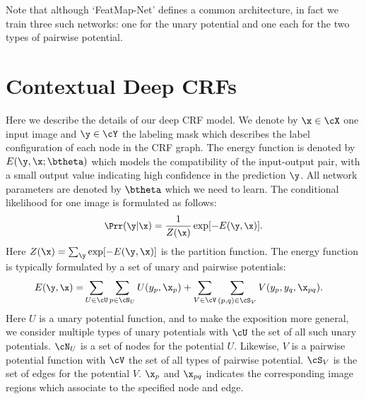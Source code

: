 Note that although `FeatMap-Net' defines a common architecture, in fact we train three such networks: one for the unary potential and one each for the two types of pairwise potential.




\section{Contextual Deep CRFs}
\label{sec:crf_details}

Here we describe the details of our deep CRF model.
We denote by $\x \in \cX$ one input image and $\y \in \cY$ the labeling mask which describes the label configuration of each node in the CRF graph.
The energy function is denoted by $E(\y, \x; \btheta)$ which models the compatibility of the input-output pair, with a small output value indicating high confidence in the prediction $\y$.
All network parameters are denoted by $\btheta$ which we need to learn.
The conditional likelihood for one image is formulated as follows:
\begin{equation}\label{eq:prob}
\begin{aligned}
\small
\Prr(\y|\x) = \frac{1}{Z(\x)} \exp [- E(\y, \x)].
\end{aligned}
\end{equation}
%
%
%
%
%
%
Here $Z(\x) = \sum_{\y} \exp [ -E(\y, \x) ]$ is the partition function.
The energy function is typically formulated by a set of unary and pairwise potentials:
\begin{align}
\label{eq:energy}
\small
	E(\y, \x) = &  \sum_{U \in \cU} \sum_{p \in \cN_U } U(y_{p}, \x_p) %
  + \sum_{V \in \cV} \sum_{(p,q) \in \cS_V} V(y_{p}, y_{q}, \x_{pq}). \notag
\end{align}
Here $U$ is a unary potential function,
and to make the exposition more general, we consider multiple types of unary potentials with
$\cU$ the set of all such unary potentials.
$\cN_U$ is a set of nodes for the potential $U$.
Likewise, $V$ is a pairwise potential function
 with $\cV$ the set of all types of pairwise potential. $\cS_V$ is the set of edges for the potential $V$.
$\x_{p}$ and $\x_{pq}$  indicates the corresponding image regions which associate to the specified node and edge.













